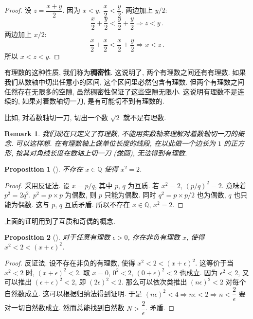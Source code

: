 \documentclass[UTF8]{ctexart}
\theoremstyle{mystyle}
\newtheorem{proposition}{Proposition}[section]
\theoremstyle{myremark}
\newtheorem*{remark}{Remark}
\theoremstyle{plain}
\newcommand{\Q}{\mathbb Q}
\begin{document}
\begin{proof}
    设 $ z = \dfrac{x + y}{2} $. 因为 $ x < y $, $ \dfrac{x}{2} < \dfrac{y}{2} $. 两边加上 $ y/2 $: \[ \dfrac{x}{2} + \dfrac{y}{2} < \dfrac{y}{2} + \dfrac{y}{2} \Longrightarrow z < y \,.\] 两边加上 $ x/2 $: \[ \dfrac{x}{2} + \dfrac{x}{2} < \dfrac{x}{2} + \dfrac{y}{2} \Longrightarrow x < z \,.\] 所以 $ x < z < y $.
\end{proof}

有理数的这种性质, 我们称为\textbf{稠密性}. 这说明了, 两个有理数之间还有有理数. 如果我们从数轴中切出任意小的区间, 这个区间里必然包含有理数. 但两个有理数之间任然存在无限多的空隙, 虽然稠密性保证了这些空隙无限小. 这说明有理数不是连续的, 如果对着数轴切一刀, 是有可能切不到有理数的.

比如, 对着数轴切一刀, 切出一个数 $ \sqrt{2} $ 就不是有理数.

\begin{remark}
    我们现在只定义了有理数, 不能用实数轴来理解对着数轴切一刀的概念. 可以这样想. 在有理数轴上做单位长度的线段, 在以此做一个边长为 $ 1 $ 的正方形, 按其对角线长度在数轴上切一刀 (做圆), 无法得到有理数.
\end{remark}

\begin{proposition}[]
    不存在 $ x \in \Q $ 使得 $ x^2 = 2 $.
\end{proposition}

\begin{proof}
    采用反证法. 设 $ x = p/q $, 其中 $ p $, $ q $ 为互质. 若 $ x^2 = 2 $, $ (p / q)^2 = 2 $. 意味着 $ p^2 = 2 q^2 $. $ p^2 = p \times p $ 为偶数, 则 $ p $ 只能为偶数. 同时 $ q^2 = p \times p / 2 $ 也为偶数, $ q $ 也只能为偶数. 这与 $ p $, $ q $ 互质矛盾. 所以不存在 $ x \in \Q $, $ x^2 = 2 $.
\end{proof}

上面的证明用到了互质和奇偶的概念.

\begin{proposition}[]
    对于任意有理数 $ \epsilon > 0 $, 存在非负有理数 $ x $, 使得 $ x^2 < 2 < (x + \epsilon)^2 $.
\end{proposition}

\begin{proof}
    反证法. 设不存在非负的有理数, 使得 $ x^2 < 2 < (x + \epsilon)^2 $. 这等价于当 $ x^2 < 2 $ 时, $ (x + \epsilon)^2 < 2 $. 取 $ x = 0 $, $ 0^2 < 2 $, $ (0 + \epsilon)^2 < 2 $ 也成立. 因为 $ \epsilon^2 < 2 $, 又可以推出 $ (\epsilon + \epsilon)^2 < 2 $, 即 $ (2\epsilon)^2 < 2 $. 那么可以依次类推出 $ (n\epsilon)^2 < 2 $ 对每个自然数成立. 这可以根据归纳法得到证明. 于是 $ (n \epsilon)^2 < 4 \Longrightarrow n \epsilon < 2 \Longrightarrow n < \dfrac{2}{\epsilon} $ 要对一切自然数成立. 然而总能找到自然数 $ N > \dfrac{2}{\epsilon} $. 矛盾.
\end{proof}
\end{document}
